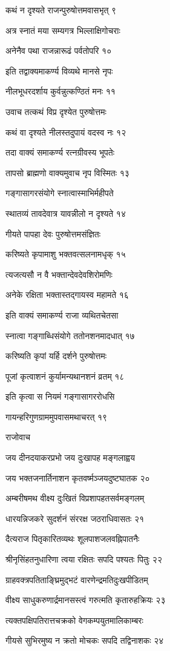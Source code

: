 कथं न दृश्यते राजन्पुरुषोत्तमवासभृत् ९

अत्र स्नातं मया सम्यगत्र भिल्लाक्षिगोचराः

अनेनैव पथा राजन्नारूढं पर्वतोपरि १०

इति तद्वाक्यमाकर्ण्य विव्यथे मानसे नृपः

नीलभूधरदर्शाय कुर्वन्नुत्कण्ठितं मनः ११

उवाच तत्कथं विप्र दृश्येत पुरुषोत्तमः

कथं वा दृश्यते नीलस्तदुपायं वदस्व नः १२

तदा वाक्यं समाकर्ण्य रत्नग्रीवस्य भूपतेः

तापसो ब्राह्मणो वाक्यमुवाच नृप विस्मितः १३

गङ्गासागरसंयोगे स्नात्वास्माभिर्महीपते

स्थातव्यं तावदेवात्र यावन्नीलो न दृश्यते १४

गीयते पापहा देवः पुरुषोत्तमसंज्ञितः

करिष्यते कृपामाशु भक्तवत्सलनामधृक् १५

त्यजत्यसौ न वै भक्तान्देवदेवशिरोमणिः

अनेके रक्षिता भक्तास्तद्गायस्व महामते १६

इति वाक्यं समाकर्ण्य राजा व्यथितचेतसा

स्नात्वा गङ्गाब्धिसंयोगे ततोनशनमादधात् १७

करिष्यति कृपां यर्हि दर्शने पुरुषोत्तमः

पूजां कृत्वाशनं कुर्यामन्यथानशनं व्रतम् १८

इति कृत्वा स नियमं गङ्गासागररोधसि

गायन्हरिगुणग्राममुपवासमथाचरत् १९

राजोवाच

जय दीनदयाकरप्रभो जय दुःखापह मङ्गलाह्वय

जय भक्तजनार्तिनाशन कृतवर्ष्मञ्जयदुष्टघातक २०

अम्बरीषमथ वीक्ष्य दुःखितं विप्रशापहतसर्वमङ्गलम्

धारयन्निजकरे सुदर्शनं संररक्ष जठराधिवासतः २१

दैत्यराज पितृकारितव्यथः शूलपाशजलवह्निपातनैः

श्रीनृसिंहतनुधारिणा त्वया रक्षितः सपदि पश्यतः पितुः २२

ग्राहवक्त्रपतिताङ्घ्रिमुद्भटं वारणेन्द्रमतिदुःखपीडितम्

वीक्ष्य साधुकरुणार्द्रमानसस्त्वं गरुत्मति कृतारुहक्रियः २३

त्यक्तपक्षिपतिरात्तचक्रको वेगकम्पयुतमालिकाम्बरः

गीयसे सुभिरमुष्य न क्रतो मोचकः सपदि तद्विनाशकः २४

